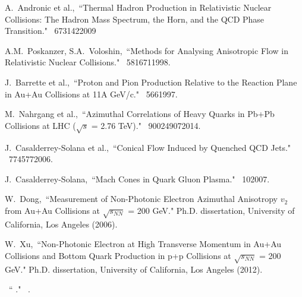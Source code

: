 \begin{thebibliography}{1000}
A.~Andronic et al.,~``Thermal Hadron Production in Relativistic Nuclear Collisions: The Hadron Mass Spectrum, the Horn, and the QCD Phase Transition." \Journal{\PLB} {~673}{142}{2009}

A.M.~Poskanzer, S.A.~Voloshin,~``Methods for Analysing Anisotropic Flow in Relativistic Nuclear Collisions." \Journal{\PRC} {~58}{1671}{1998}.

J.~Barrette et al.,~``Proton and Pion Production Relative to the Reaction Plane in Au+Au Collisions at 11A GeV/c." \Journal{\PRC} {~56}{6}{1997}.

M.~Nahrgang et al.,~``Azimuthal Correlations of Heavy Quarks in Pb+Pb Collisions at LHC ($\sqrt{s}$ = 2.76 TeV)." \Journal{\PRC} {~90}{024907}{2014}.

J.~Casalderrey-Solana et al.,~``Conical Flow Induced by Quenched QCD Jets." \Journal{\NPA} {~774}{577}{2006}.

J.~Casalderrey-Solana,~``Mach Cones in Quark Gluon Plasma." \Journal{\JPG} {~10}{}{2007}.

W.~Dong,~``Measurement of Non-Photonic Electron Azimuthal Anisotropy $v_2$ from Au+Au Collisions at $\sqrt{s_{NN}}$ = 200 GeV." Ph.D. dissertation, University of California, Los Angeles (2006).

W.~Xu,~``Non-Photonic Electron at High Transverse Momentum in Au+Au Collisions and Bottom Quark Production in p+p Collisions at $\sqrt{s_{NN}}$ = 200 GeV." Ph.D. dissertation, University of California, Los Angeles (2012).

\bibitem{}
~`` ." \Journal{} {~}{}{}.

\end{thebibliography}
